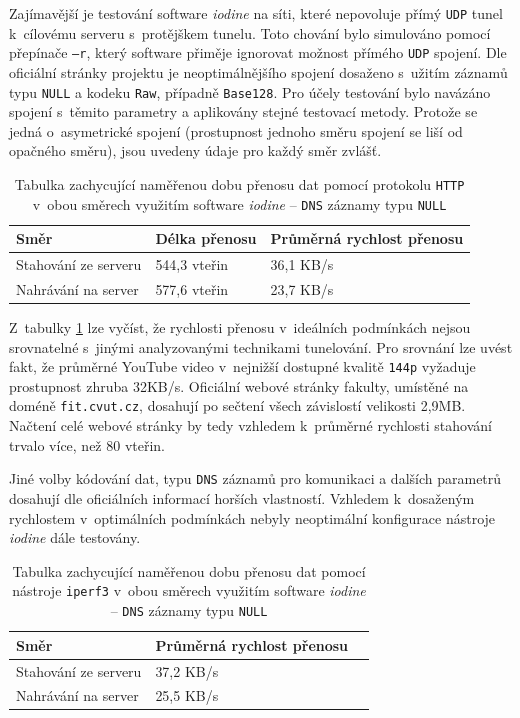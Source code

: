 \documentclass[thesis=M,czech]{FITthesis}[2012/10/20]
\begin{document}
Zajímavější je testování software \textit{iodine} na síti, které nepovoluje přímý \texttt{UDP} tunel k~cílovému serveru s~protějškem tunelu. Toto chování bylo simulováno pomocí přepínače \texttt{--r}, který software přiměje ignorovat možnost přímého \texttt{UDP} spojení. Dle oficiální stránky projektu je neoptimálnějšího spojení dosaženo s~užitím záznamů typu \texttt{NULL} a kodeku \texttt{Raw}, případně \texttt{Base128}. Pro účely testování bylo navázáno spojení s~těmito parametry a aplikovány stejné testovací metody. Protože se jedná o~asymetrické spojení (prostupnost jednoho směru spojení se liší od opačného směru), jsou uvedeny údaje pro každý směr zvlášť.


    \begin{table}[h]
	\centering
	\begin{tabular}{|l||l|l|}
	\hline
	Směr  & Délka přenosu & Průměrná rychlost přenosu \\ \hline \hline
	Stahování ze serveru  & 544,3 vteřin   & 36,1 KB/s                 \\ \hline
	Nahrávání na server   & 577,6 vteřin   & 23,7 KB/s                 \\ \hline
	\end{tabular}
	\caption{Tabulka zachycující naměřenou dobu přenosu dat pomocí protokolu \texttt{HTTP} v~obou směrech využitím software \textit{iodine} -- \texttt{DNS} záznamy typu \texttt{NULL}}
	\label{tab:iodine-down-up}
    \end{table}
    
    
    Z~tabulky \ref{tab:iodine-down-up} lze vyčíst, že rychlosti přenosu v~ideálních podmínkách nejsou srovnatelné s~jinými analyzovanými technikami tunelování. Pro srovnání lze uvést fakt, že průměrné YouTube video v~nejnižší dostupné kvalitě \texttt{144p} vyžaduje prostupnost zhruba 32KB/s\cite{youtube-data-usage}. Oficiální webové stránky fakulty, umístěné na doméně \texttt{fit.cvut.cz}, dosahují po sečtení všech závislostí velikosti 2,9MB. Načtení celé webové stránky by tedy vzhledem k~průměrné rychlosti stahování trvalo více, než 80 vteřin.
    
    Jiné volby kódování dat, typu \texttt{DNS} záznamů pro komunikaci a dalších parametrů dosahují dle oficiálních informací\cite{iodine-repo} horších vlastností. Vzhledem k~dosaženým rychlostem v~optimálních podmínkách nebyly neoptimální konfigurace nástroje \textit{iodine} dále testovány.
    
    
    \begin{table}[h]
	\centering
	\begin{tabular}{|l||l|l|}
	\hline
	Směr  & Průměrná rychlost přenosu \\ \hline \hline
	Stahování ze serveru  & 37,2 KB/s                 \\ \hline
	Nahrávání na server   & 25,5 KB/s                 \\ \hline
	\end{tabular}
	\caption{Tabulka zachycující naměřenou dobu přenosu dat pomocí nástroje \texttt{iperf3} v~obou směrech využitím software \textit{iodine} -- \texttt{DNS} záznamy typu \texttt{NULL}}
	\label{tab:iperf-download}
    \end{table}
    
\end{document}
